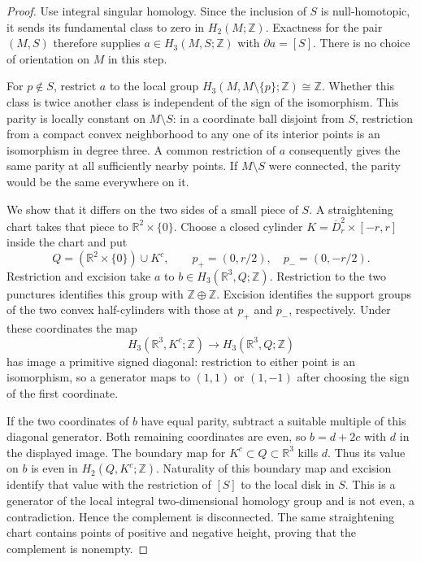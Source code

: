 \begin{proof}
Use integral singular homology. Since the inclusion of $S$ is null-homotopic,
it sends its fundamental class to zero in $H_2(M;\mathbb Z)$. Exactness for
the pair $(M,S)$ therefore supplies $a\in H_3(M,S;\mathbb Z)$ with
$\partial a=[S]$. There is no choice of orientation on $M$ in this step.

For $p\notin S$, restrict $a$ to the local group
$H_3(M,M\setminus\{p\};\mathbb Z)\cong\mathbb Z$. Whether this class is
twice another class is independent of the sign of the isomorphism.
This parity is locally constant on $M\setminus S$: in a coordinate ball
disjoint from $S$, restriction from a compact convex neighborhood to any
one of its interior points is an isomorphism in degree three. A common
restriction of $a$ consequently gives the same parity at all sufficiently
nearby points. If $M\setminus S$ were connected, the parity would be the
same everywhere on it.

We show that it differs on the two sides of a small piece of $S$. A
straightening chart takes that piece to $\mathbb R^2\times\{0\}$.
Choose a closed cylinder $K=\overline D_r^2\times[-r,r]$ inside the chart
and put
\[
 Q=(\mathbb R^2\times\{0\})\cup K^c,\qquad
 p_+=(0,r/2),\quad p_-=(0,-r/2).
\]
Restriction and excision take $a$ to $b\in H_3(\mathbb R^3,Q;\mathbb Z)$.
Restriction to the two punctures identifies this group with
$\mathbb Z\oplus\mathbb Z$. Excision identifies the support groups of
the two convex half-cylinders with those at $p_+$ and $p_-$, respectively.
Under these coordinates the map
\[
 H_3(\mathbb R^3,K^c;\mathbb Z)\longrightarrow
 H_3(\mathbb R^3,Q;\mathbb Z)
\]
has image a primitive signed diagonal: restriction to either point is an
isomorphism, so a generator maps to $(1,1)$ or $(1,-1)$ after choosing
the sign of the first coordinate.

If the two coordinates of $b$ have equal parity, subtract a suitable
multiple of this diagonal generator. Both remaining coordinates are even,
so $b=d+2c$ with $d$ in the displayed image. The boundary map for
$K^c\subset Q\subset\mathbb R^3$ kills $d$. Thus its value on $b$ is
even in $H_2(Q,K^c;\mathbb Z)$. Naturality of this boundary map and
excision identify that value with the restriction of $[S]$ to the local
disk in $S$. This is a generator of the local integral two-dimensional
homology group and is not even, a contradiction. Hence the complement
is disconnected. The same straightening chart contains points of
positive and negative height, proving that the complement is nonempty.
\end{proof}

